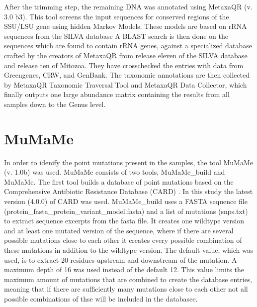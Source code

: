 
After the trimming step, the remaining DNA was annotated using MetaxaQR (v. 3.0 b3)\cite{bengtsson-palme2015Metaxa2Improved}. This tool screens the input sequences for conserved regions of the SSU/LSU gene using hidden Markov Models. These models are based on rRNA sequences from the SILVA database\cite{quast2012SILVARibosomalRNA} 
    A BLAST search \cite{camacho2009BLASTArchitectureApplications} is then done on the sequences which are found to contain rRNA genes, against a specialized database crafted by the creators of MetaxaQR from release eleven of the SILVA database \cite{quast2012SILVARibosomalRNA} and release ten of Mitozoa\cite{donoriodemeo2012MitoZoa20Database}. They have crosschecked the entries with data from Greengenes, CRW, and GenBank. 
The taxonomic annotations are then collected by MetaxaQR Taxonomic Traversal Tool and MetaxaQR Data Collector, which finally outputs one large abundance matrix containing the results from all samples down to the Genus level. 


\section{MuMaMe}
In order to idenify the point mutations present in the samples, the tool MuMaMe (v. 1.0b)\cite{magesh2019MumameSoftwareTool} was used. MuMaMe consists of two tools, MuMaMe\_build and MuMaMe. 
The first tool builds a database of point mutations based on the Comprehensive Antibiotic Resistance Database (CARD) \cite{alcock2023CARD2023Expanded}. In this study the latest version (4.0.0) of CARD was used.
MuMaMe\_build uses a FASTA sequence file (protein\_fasta\_protein\_variant\_model.fasta) and a list of mutations (snps.txt) to extract sequence excerpts from the fasta file. It creates one wildtype version and at least one mutated version of the sequence, where if there are several possible mutations close to each other it creates every possible combination of these mutations in addition to the wildtype version. 
The default value, which was used, is to extract 20 residues upstream and downstream of the mutation. 
A maximum depth of 16 was used instead of the default 12. This value limits the maximum amount of mutations that are combined to create the database entries, 
meaning that if there are sufficiently many mutations close to each other not all possible combinations of thse will be included in the databasee.

